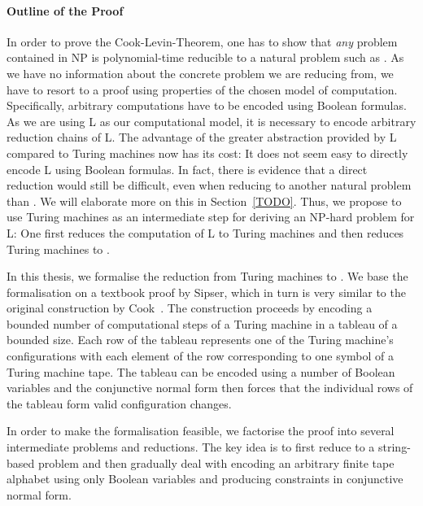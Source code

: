 \paragraph{Outline of the Proof}
In order to prove the Cook-Levin-Theorem, one has to show that \emph{any} problem contained in NP is polynomial-time reducible to a natural problem such as \SAT{}. 
As we have no information about the concrete problem we are reducing from, we have to resort to a proof using properties of the chosen model of computation. 
Specifically, arbitrary computations have to be encoded using Boolean formulas.
As we are using L as our computational model, it is necessary to encode arbitrary reduction chains of L. The advantage of the greater abstraction provided by L compared to Turing machines now has its cost: It does not seem easy to directly encode L using Boolean formulas. In fact, there is evidence that a direct reduction would still be difficult, even when reducing to another natural problem than \SAT{}. We will elaborate more on this in Section~\ref{TODO}.
Thus, we propose to use Turing machines as an intermediate step for deriving an NP-hard problem for L: One first reduces the computation of L to Turing machines and then reduces Turing machines to \SAT{}. 

In this thesis, we formalise the reduction from Turing machines to \SAT{}. We base the formalisation on a textbook proof by Sipser\cite{Sipser:TheoryofComputation}, which in turn is very similar to the original construction by Cook~\cite{cook_theorem}. The construction proceeds by encoding a bounded number of computational steps of a Turing machine in a tableau of a bounded size. 
Each row of the tableau represents one of the Turing machine's configurations with each element of the row corresponding to one symbol of a Turing machine tape. The tableau can be encoded using a number of Boolean variables and the conjunctive normal form then forces that the individual rows of the tableau form valid configuration changes.

In order to make the formalisation feasible, we factorise the proof into several intermediate problems and reductions. The key idea is to first reduce to a string-based problem and then gradually deal with encoding an arbitrary finite tape alphabet using only Boolean variables and producing constraints in conjunctive normal form. 

